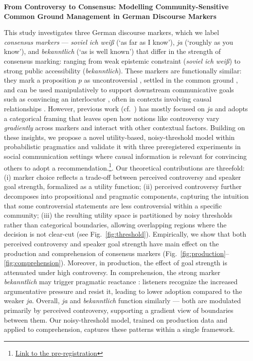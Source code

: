 \documentclass[12pt]{article}
\begin{document}
\noindent\textbf{\large From Controversy to Consensus: Modelling Community-Sensitive Common Ground Management in German Discourse Markers}


This study investigates three German discourse markers, which we label \emph{consensus markers} --- \textit{soviel ich wei\ss} (`as far as I know'), \textit{ja} (`roughly as you know'), and \textit{bekanntlich} (`as is well known') that differ in the strength of consensus marking: ranging from weak epistemic constraint (\textit{soviel ich weiß}) to strong public accessibility (\textit{bekanntlich}). 
These markers are functionally similar: they mark a proposition $p$ as uncontroversial \citep{zimmermann2011discourse}, settled in the common ground \citep{repp2013common}, and can be used manipulatively to support downstream communicative goals such as convincing an interlocutor \citep{doring2016modal}, often in contexts involving causal relationships \citep{seemann2025}. 
However, previous work (cf.\ \citep{grosz2021discourse}) has mostly focused on \textit{ja} and adopts a categorical framing that leaves open how notions like controversy vary \emph{gradiently} across markers and interact with other contextual factors. 
Building on these insights, we propose a novel utility-based, noisy-threshold model within probabilistic pragmatics \citep{goodman2016pragmatic, franke2016probabilistic, degen2023rational} and validate it with three preregistered experiments in social communication settings where causal information is relevant for convincing others to adopt a recommendation.\footnote{\href{https://osf.io/8snhk/overview?view\_only=c11af15b84814625832957bd31f561bb}{Link to the pre-registration}}.
Our theoretical contributions are threefold: (i) marker choice reflects a trade-off between perceived controversy and speaker goal strength, formalized as a utility function; (ii) perceived controversy further decomposes into propositional and pragmatic components, capturing the intuition that some controversial statements are less controversial within a specific community; (iii) the resulting utility space is partitioned by noisy thresholds rather than categorical boundaries, allowing overlapping regions where the decision is not clear-cut (see Fig.\ \ref{fig:threshold}). 
Empirically, we show that both perceived controversy and speaker goal strength have main effect on the production and comprehension of consensus markers (Fig.\ \ref{fig:production}--\ref{fig:comprehension}). Moreover, in production, the effect of goal strength is attenuated under high controversy. In comprehension, the strong marker \textit{bekanntlich} may trigger pragmatic reactance \citep{Brehm1966-BREATO-2}: listeners recognize the increased argumentative pressure and resist it, leading to lower adoption compared to the weaker \textit{ja}. Overall, \textit{ja} and \textit{bekanntlich} function similarly --- both are modulated primarily by perceived controversy, supporting a gradient view of boundaries between them. Our noisy-threshold model, trained on production data and applied to comprehension, captures these patterns within a single framework.
\end{document}
